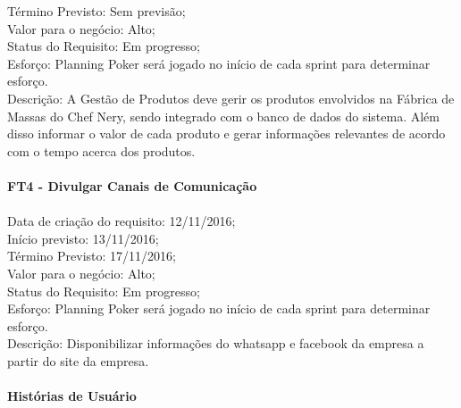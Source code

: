 \begin{apendicesenv}
\tab Término Previsto: Sem previsão;\\
\tab Valor para o negócio: Alto;\\
\tab Status do Requisito: Em progresso;\\
\tab Esforço: Planning Poker será jogado no início de cada sprint para determinar esforço.\\
\tab Descrição:  A Gestão de Produtos deve gerir os produtos envolvidos na Fábrica de Massas do Chef Nery, sendo integrado com o banco de dados do sistema. Além disso informar o valor de cada produto e gerar informações relevantes de acordo com o tempo acerca dos produtos.\\
\\
\textbf{FT4 - Divulgar Canais de Comunicação }\\ \\
\tab Data de criação do requisito: 12/11/2016;\\
\tab Início previsto: 13/11/2016;\\
\tab Término Previsto: 17/11/2016;\\
\tab Valor para o negócio: Alto;\\
\tab Status do Requisito: Em progresso;\\
\tab Esforço: Planning Poker será jogado no início de cada sprint para determinar esforço.\\
\tab Descrição: Disponibilizar informações do whatsapp e facebook da empresa a partir do site da empresa.\\
\\

\textbf{Histórias de Usuário}\\



\end{apendicesenv}
